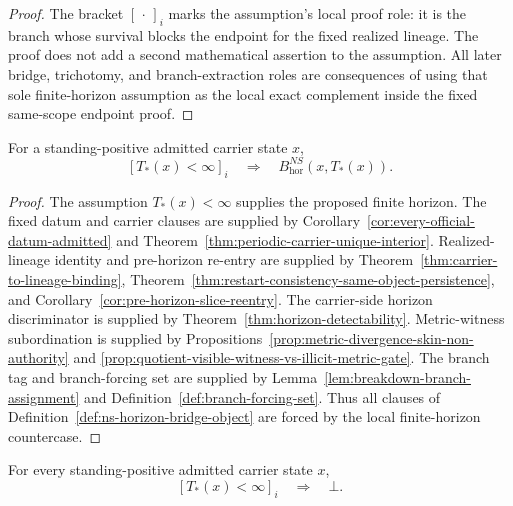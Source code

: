\begin{proof}
The bracket $[\,\cdot\,]_i$ marks the assumption's local proof role: it is the branch whose survival blocks the endpoint for the fixed realized lineage. The proof does not add a second mathematical assertion to the assumption. All later bridge, trichotomy, and branch-extraction roles are consequences of using that sole finite-horizon assumption as the local exact complement inside the fixed same-scope endpoint proof.
\end{proof}

\begin{manualtheorem}
\label{thm:ns-countercase-induces-horizon-bridge}
For a standing-positive admitted carrier state $x$,
\[
[T_*(x)<\infty]_i\quad\Longrightarrow\quad B^{NS}_{\mathrm{hor}}(x,T_*(x)).
\]
\end{manualtheorem}

\begin{proof}
The assumption $T_*(x)<\infty$ supplies the proposed finite horizon. The fixed datum and carrier clauses are supplied by Corollary~\ref{cor:every-official-datum-admitted} and Theorem~\ref{thm:periodic-carrier-unique-interior}. Realized-lineage identity and pre-horizon re-entry are supplied by Theorem~\ref{thm:carrier-to-lineage-binding}, Theorem~\ref{thm:restart-consistency-same-object-persistence}, and Corollary~\ref{cor:pre-horizon-slice-reentry}. The carrier-side horizon discriminator is supplied by Theorem~\ref{thm:horizon-detectability}. Metric-witness subordination is supplied by Propositions~\ref{prop:metric-divergence-skin-non-authority} and \ref{prop:quotient-visible-witness-vs-illicit-metric-gate}. The branch tag and branch-forcing set are supplied by Lemma~\ref{lem:breakdown-branch-assignment} and Definition~\ref{def:branch-forcing-set}. Thus all clauses of Definition~\ref{def:ns-horizon-bridge-object} are forced by the local finite-horizon countercase.
\end{proof}

\begin{manualtheorem}
\label{thm:ns-local-finite-horizon-contradiction}
For every standing-positive admitted carrier state $x$,
\[
[T_*(x)<\infty]_i\quad\Longrightarrow\quad\bot.
\]
\end{manualtheorem}

